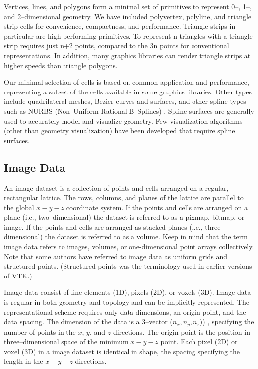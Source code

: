 Vertices, lines, and polygons form a minimal set of primitives to represent 0--, 1--, and 2--dimensional geometry. We have included polyvertex, polyline, and triangle strip cells for convenience, compactness, and performance. Triangle strips in particular are high-performing primitives. To represent n triangles with a triangle strip requires just n+2 points, compared to the 3n points for conventional representations. In addition, many graphics libraries can render triangle strips at higher speeds than triangle polygons.

Our minimal selection of cells is based on common application and performance, representing a subset of the cells available in some graphics libraries. Other types include quadrilateral meshes, Bezier curves and surfaces, and other spline types such as NURBS (Non--Uniform Rational B--Splines) \cite{Mortenson85}. Spline surfaces are generally used to accurately model and visualize geometry. Few visualization algorithms (other than geometry visualization) have been developed that require spline surfaces.

\subsection{Image Data}
\label{subsec:image_data}

An image dataset is a collection of points and cells arranged on a regular, rectangular lattice. The rows, columns, and planes of the lattice are parallel to the global $x-y-z$ coordinate system. If the points and cells are arranged on a plane (i.e., two--dimensional) the dataset is referred to as a pixmap, bitmap, or image. If the points and cells are arranged as stacked planes (i.e., three--dimensional) the dataset is referred to as a volume. Keep in mind that the term image data refers to images, volumes, or one-dimensional point arrays collectively. Note that some authors have referred to image data as uniform grids and structured points. (Structured points was the terminology used in earlier versions of VTK.)

Image data consist of line elements (1D), pixels (2D), or voxels (3D). Image data is regular in both geometry and topology and can be implicitly represented. The representational scheme requires only data dimensions, an origin point, and the data spacing. The dimension of the data is a 3--vector ($n_x,n_y,n_z)$) , specifying the number of points in the $x$, $y$, and $z$ directions. The origin point is the position in three--dimensional space of the minimum $x-y-z$ point. Each pixel (2D) or voxel (3D) in a image dataset is identical in shape, the spacing specifying the length in the $x-y-z$ directions.

